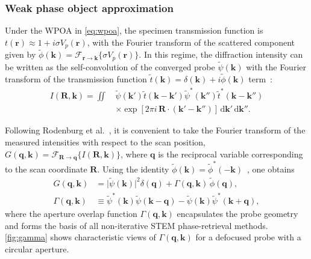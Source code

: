 \documentclass[pdflatex,sn-aps,iicol]{sn-jnl}%
\begin{document}
\subsubsection*{Weak phase object approximation}

Under the WPOA in \cref{eq:wpoa}, the specimen transmission function is $t(\boldsymbol{r}) \approx 1 + i \sigma V_p(\boldsymbol{r})$, with the Fourier transform of the scattered component given by $\tilde{\phi}(\boldsymbol{k}) = \mathcal{F}_{\boldsymbol{r}\rightarrow\boldsymbol{k}}\{\sigma V_p(\boldsymbol{r})\}$.
In this regime, the diffraction intensity can be written as the self-convolution of the converged probe $\tilde{\psi}(\boldsymbol{k})$ with the Fourier transform of the transmission function $\tilde{t}(\boldsymbol{k}) = \delta(\boldsymbol{k}) + i \tilde{\phi}(\boldsymbol{k})$ term~\cite{Rodenburg_1993}:
\begin{align}
  I(\boldsymbol{R},\boldsymbol{k}) = \iint\, &\tilde{\psi}(\boldsymbol{k}')
  \tilde{t}(\boldsymbol{k}-\boldsymbol{k}')
  \tilde{\psi}^{*}(\boldsymbol{k}'')
  \tilde{t}^{*}(\boldsymbol{k}-\boldsymbol{k}'') \nonumber \\
  &\times \exp\!\left[2\pi i\,\boldsymbol{R}\cdot(\boldsymbol{k}'-\boldsymbol{k}'')\right]
  \,\mathrm{d}\boldsymbol{k}'\,\mathrm{d}\boldsymbol{k}'' .
  \label{eq:wpoa-intensity}
\end{align}

Following Rodenburg et al.~\cite{Rodenburg_1993}, it is convenient to take the Fourier transform of the measured intensities with respect to the scan position, $G(\boldsymbol{q},\boldsymbol{k}) = \mathcal{F}_{\boldsymbol{R}\rightarrow\boldsymbol{q}}\{I(\boldsymbol{R},\boldsymbol{k})\}$, where $\boldsymbol{q}$ is the reciprocal variable corresponding to the scan coordinate $\boldsymbol{R}$.
Using the identity $\tilde{\phi}(\boldsymbol{k}) = \tilde{\phi}^{*}(-\boldsymbol{k})$~\cite{Rodenburg_1993}, one obtains~\cite{Yang_2016}
\begin{align}
  G(\boldsymbol{q},\boldsymbol{k}) &= \lvert \tilde{\psi}(\boldsymbol{k}) \rvert^2 \delta(\boldsymbol{q}) + \Gamma(\boldsymbol{q},\boldsymbol{k})\,\tilde{\phi}(\boldsymbol{q}), \\
  \Gamma(\boldsymbol{q},\boldsymbol{k}) &\equiv \tilde{\psi}^{*}(\boldsymbol{k})\tilde{\psi}(\boldsymbol{k}-\boldsymbol{q}) - \tilde{\psi}(\boldsymbol{k})\tilde{\psi}^{*}(\boldsymbol{k}+\boldsymbol{q}),
  \label{eq:wpoa-forward}
\end{align}
where the aperture overlap function $\Gamma(\boldsymbol{q},\boldsymbol{k})$ encapsulates the probe geometry and forms the basis of all non-iterative STEM phase-retrieval methods.
\cref{fig:gamma} shows characteristic views of $\Gamma(\boldsymbol{q},\boldsymbol{k})$ for a defocused probe with a circular aperture.
\end{document}
